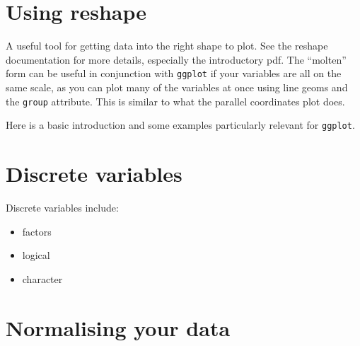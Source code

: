 \section{Using reshape}\label{sec:using_reshape}

A useful tool for getting data into the right shape to plot.  See the reshape documentation for more details, especially the introductory pdf.  The ``molten'' form can be useful in conjunction with {\tt ggplot} if your variables are all on the same scale, as you can plot many of the variables at once using line geoms and the {\tt group} attribute.  This is similar to what the parallel coordinates plot does.

Here is a basic introduction and some examples particularly relevant for {\tt ggplot}.

% 
% 

\section{Discrete variables}
\label{sec:vartypes}

Discrete variables include:

\begin{itemize}
  \item factors
  \item logical
  \item character
\end{itemize}

\section{Normalising your data}
\label{sec:normalising_your_data}





